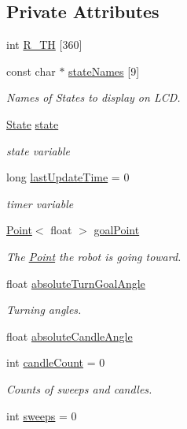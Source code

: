 \subsection*{Private Attributes}
\begin{DoxyCompactItemize}
\item 
int \hyperlink{classSearcher_ab21f940dc1ed76c01611be56b95961e1}{R\-\_\-\-T\-H} \mbox{[}360\mbox{]}
\item 
const char $\ast$ \hyperlink{classSearcher_a2403bbf24da371ea9a31eeaec1f98b96}{state\-Names} \mbox{[}9\mbox{]}
\begin{DoxyCompactList}\small\item\em Names of States to display on L\-C\-D. \end{DoxyCompactList}\item 
\hyperlink{classSearcher_ae8599d557b97324ac716e105dc044c57}{State} \hyperlink{classSearcher_aadc83ce2d77610d6572f98ecd8b4d6e4}{state}
\begin{DoxyCompactList}\small\item\em state variable \end{DoxyCompactList}\item 
long \hyperlink{classSearcher_a91de3c7ecdda8d3a6d231c35fbf363c5}{last\-Update\-Time} = 0
\begin{DoxyCompactList}\small\item\em timer variable \end{DoxyCompactList}\item 
\hyperlink{classPoint}{Point}$<$ float $>$ \hyperlink{classSearcher_ae2eb4f5be779517a4e3264b0223459e2}{goal\-Point}
\begin{DoxyCompactList}\small\item\em The \hyperlink{classPoint}{Point} the robot is going toward. \end{DoxyCompactList}\item 
float \hyperlink{classSearcher_aed8b034d6faa5556330af017c56f3a53}{absolute\-Turn\-Goal\-Angle}
\begin{DoxyCompactList}\small\item\em Turning angles. \end{DoxyCompactList}\item 
float \hyperlink{classSearcher_a5a2d774c5f42091cbb584cfe944313d6}{absolute\-Candle\-Angle}
\item 
int \hyperlink{classSearcher_acd63673f1b401dffee29f88eceaa1ada}{candle\-Count} = 0
\begin{DoxyCompactList}\small\item\em Counts of sweeps and candles. \end{DoxyCompactList}\item 
int \hyperlink{classSearcher_af8a7e7ddce46577fca506e2f31aead60}{sweeps} = 0
\end{DoxyCompactItemize}
